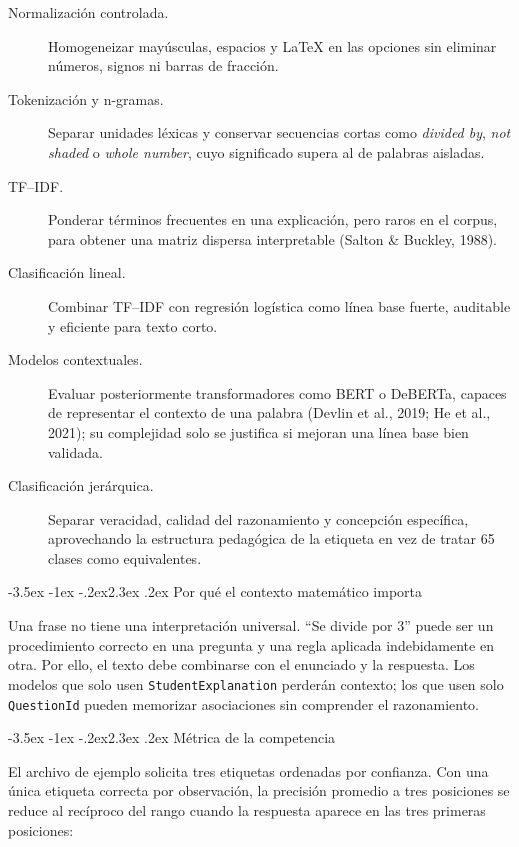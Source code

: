 \documentclass[11pt,oneside,openany]{book}
\makeatletter
\renewcommand\section{\@startsection{section}{1}{\z@}%
  {-3.5ex \@plus -1ex \@minus -.2ex}{2.3ex \@plus .2ex}%
  {\normalfont\Large\sffamily\bfseries\color{AzulMedio}}}
\newcommand{\codigo}[1]{\texttt{#1}}
\makeatother
\begin{document}
\begin{description}
  \item[Normalización controlada.] Homogeneizar mayúsculas, espacios y LaTeX en
        las opciones sin eliminar números, signos ni barras de fracción.
  \item[Tokenización y n-gramas.] Separar unidades léxicas y conservar
        secuencias cortas como \emph{divided by}, \emph{not shaded} o
        \emph{whole number}, cuyo significado supera al de palabras aisladas.
  \item[TF--IDF.] Ponderar términos frecuentes en una explicación, pero raros
        en el corpus, para obtener una matriz dispersa interpretable
        (Salton \& Buckley, 1988).
  \item[Clasificación lineal.] Combinar TF--IDF con regresión logística como
        línea base fuerte, auditable y eficiente para texto corto.
  \item[Modelos contextuales.] Evaluar posteriormente transformadores como
        BERT o DeBERTa, capaces de representar el contexto de una palabra
        (Devlin et al., 2019; He et al., 2021); su complejidad solo se justifica si
        mejoran una línea base bien validada.
  \item[Clasificación jerárquica.] Separar veracidad, calidad del razonamiento y
        concepción específica, aprovechando la estructura pedagógica de la
        etiqueta en vez de tratar 65 clases como equivalentes.
\end{description}

\section{Por qué el contexto matemático importa}

Una frase no tiene una interpretación universal. ``Se divide por 3'' puede ser
un procedimiento correcto en una pregunta y una regla aplicada indebidamente
en otra. Por ello, el texto debe combinarse con el enunciado y la respuesta.
Los modelos que solo usen \codigo{StudentExplanation} perderán contexto; los
que usen solo \codigo{QuestionId} pueden memorizar asociaciones sin comprender
el razonamiento.

\section{Métrica de la competencia}

El archivo de ejemplo solicita tres etiquetas ordenadas por confianza. Con una
única etiqueta correcta por observación, la precisión promedio a tres
posiciones se reduce al recíproco del rango cuando la respuesta aparece en las
tres primeras posiciones:
\end{document}
